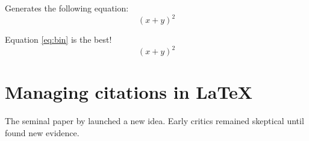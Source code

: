 \documentclass[12pt,letterpaper]{article}
\begin{document}
Generates the following equation:
$$(x + y)^{2}$$

Equation \ref{eq:bin} is the best!
\begin{equation}
\label{eq:bin}
(x + y)^{2}
\end{equation}


\section{Managing citations in \LaTeX}

The seminal paper by \citet{Baggins2019} launched a new idea. Early critics remained skeptical \citep{Gamgee2018} until \citet[chap. 1]{WoodlandC2018} found new evidence.


\newpage



\end{document}
